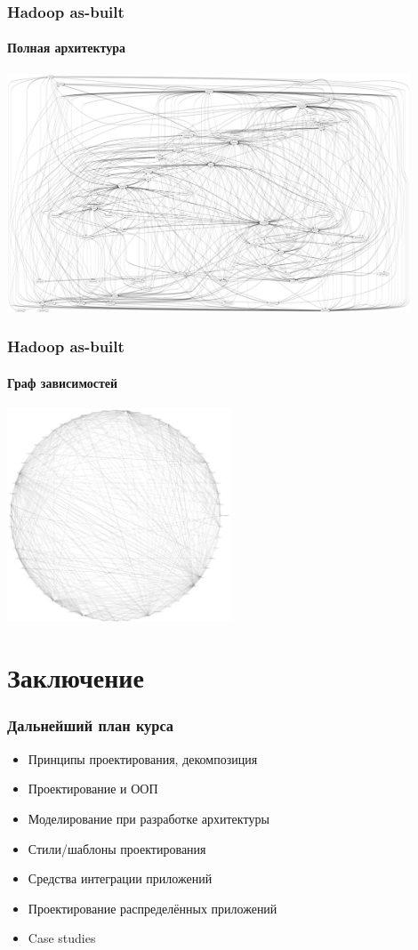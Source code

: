 \documentclass[xetex,mathserif,serif]{beamer}
\begin{document}
	\begin{frame}
		\frametitle{Hadoop as-built}
		\framesubtitle{Полная архитектура}
		\begin{center}
			\includegraphics[width=0.9\textwidth]{hadoopFull.png}
		\end{center}
	\end{frame}

	\begin{frame}
		\frametitle{Hadoop as-built}
		\framesubtitle{Граф зависимостей}
		\begin{center}
			\includegraphics[width=0.5\textwidth]{hadoopDependencies.png}
		\end{center}
	\end{frame}

	\section{Заключение}

	\begin{frame}
		\frametitle{Дальнейший план курса}
		\begin{itemize}
			\item Принципы проектирования, декомпозиция
			\item Проектирование и ООП
			\item Моделирование при разработке архитектуры
			\item Стили/шаблоны проектирования
			\item Средства интеграции приложений
			\item Проектирование распределённых приложений
			\item Case studies
		\end{itemize}
	\end{frame}
\end{document}
